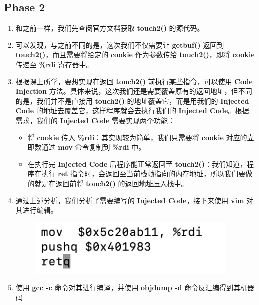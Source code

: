     \subsection{Phase 2}
        \begin{enumerate}
            \item 和之前一样，我们先查阅官方文档获取 \textbf{touch2()} 的源代码。
                
            \item 可以发现，与之前不同的是，这次我们不仅需要让 \textbf{getbuf()} 返回到 \textbf{touch2()}，而且需要将给定的 \textbf{cookie} 作为参数传给 \textbf{touch2()}，即将 \textbf{cookie} 传递至 \textbf{\%rdi} 寄存器中。
            \item 根据课上所学，要想实现在返回 \textbf{touch2()} 前执行某些指令，可以使用 \textbf{Code Injection} 方法。具体来说，这次我们还是需要覆盖原有的返回地址，但不同的是，我们并不是直接用 \textbf{touch2()} 的地址覆盖它，而是用我们的 \textbf{Injected Code} 的地址去覆盖它，这样程序就会去执行我们的 \textbf{Injected Code}。根据需求，我们的 \textbf{Injected Code} 需要实现两个功能：
                \begin{itemize}
                    \item 将 \textbf{cookie} 传入 \textbf{\%rdi}：其实现较为简单，我们只需要将 \textbf{cookie} 对应的立即数通过 \textbf{mov} 命令复制到 \textbf{\%rdi} 中。
                    \item 在执行完 \textbf{Injected Code} 后程序能正常返回至 \textbf{touch2()}：我们知道，程序在执行 \textbf{ret} 指令时，会返回至当前栈帧指向的内存地址，所以我们要做的就是在返回前将 \textbf{touch2()} 的返回地址压入栈中。
                \end{itemize}
            \item 通过上述分析，我们分析了需要编写的 \textbf{Injected Code}，接下来使用 \textbf{vim} 对其进行编辑。
                \begin{figure}[htbp]
                    \includegraphics*[width = 10cm]{s2_0.png}
                \end{figure}
            \item 使用 \textbf{gcc -c} 命令对其进行编译，并使用 \textbf{objdump -d} 命令反汇编得到其机器码
                \begin{figure}[htbp]

\end{figure}
\end{enumerate}
